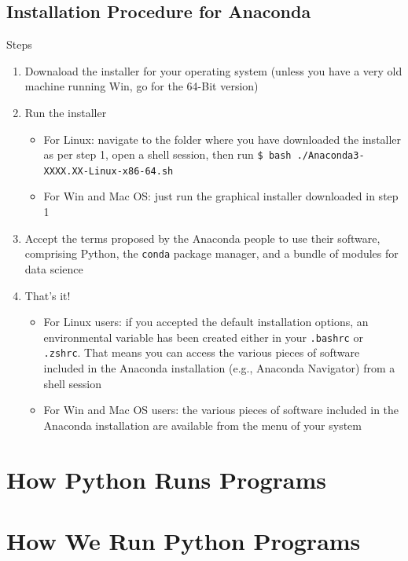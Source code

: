 \documentclass[aspectratio=1610]{beamer}
\begin{document}
\subsection{Installation Procedure for Anaconda}

\begin{frame}[c]{Steps}
	\begin{enumerate}
		\item Downaload the installer for your operating system (unless you have a very old machine running Win, go for the 64-Bit version)
		\item Run the installer
		\begin{itemize}
			\item For Linux: navigate to the folder where you have downloaded the installer as per step 1, open a shell session, then run \texttt{\$ bash ./Anaconda3-XXXX.XX-Linux-x86-64.sh}
			\item For Win and Mac OS: just run the graphical installer downloaded in step 1
		\end{itemize}
		\item Accept the terms proposed by the Anaconda people to use their software, comprising Python, the \texttt{conda} package manager, and a bundle of modules for data science
		\item That's it!
		\begin{itemize}
		\item For Linux users: if you accepted the default installation options, an environmental variable has been created either in your \texttt{.bashrc} or \texttt{.zshrc}. That means you can access the various pieces of software included in the Anaconda installation (e.g., Anaconda Navigator) from a shell session
		\item For Win and Mac OS users: the various pieces of software included in the Anaconda installation are available from the menu of your system
		\end{itemize}
	\end{enumerate}
\end{frame}

\section{How Python Runs Programs}


\section{How We Run Python Programs}
\end{document}
